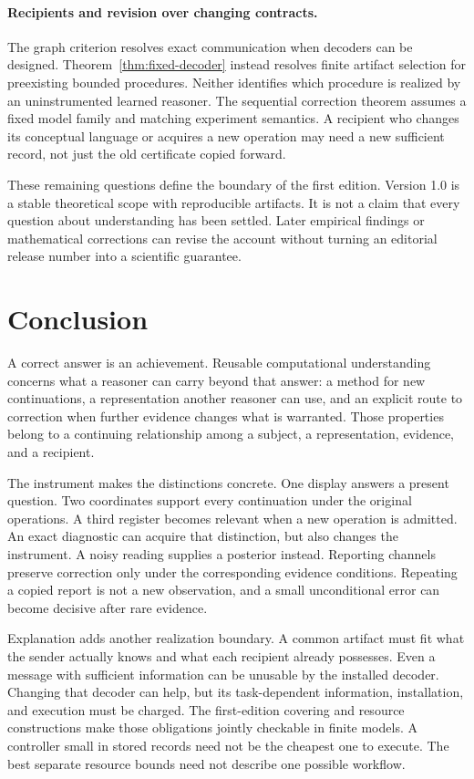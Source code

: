 \documentclass[11pt,letterpaper]{article}
\theoremstyle{plain}
\theoremstyle{definition}
\begin{document}
\paragraph{Recipients and revision over changing contracts.}
The graph criterion resolves exact communication when decoders can be designed. Theorem~\ref{thm:fixed-decoder} instead resolves finite artifact selection for preexisting bounded procedures. Neither identifies which procedure is realized by an uninstrumented learned reasoner. The sequential correction theorem assumes a fixed model family and matching experiment semantics. A recipient who changes its conceptual language or acquires a new operation may need a new sufficient record, not just the old certificate copied forward.

These remaining questions define the boundary of the first edition. Version 1.0 is a stable theoretical scope with reproducible artifacts. It is not a claim that every question about understanding has been settled. Later empirical findings or mathematical corrections can revise the account without turning an editorial release number into a scientific guarantee.

\section{Conclusion}\label{sec:conclusion}
A correct answer is an achievement. Reusable computational understanding concerns what a reasoner can carry beyond that answer: a method for new continuations, a representation another reasoner can use, and an explicit route to correction when further evidence changes what is warranted. Those properties belong to a continuing relationship among a subject, a representation, evidence, and a recipient.

The instrument makes the distinctions concrete. One display answers a present question. Two coordinates support every continuation under the original operations. A third register becomes relevant when a new operation is admitted. An exact diagnostic can acquire that distinction, but also changes the instrument. A noisy reading supplies a posterior instead. Reporting channels preserve correction only under the corresponding evidence conditions. Repeating a copied report is not a new observation, and a small unconditional error can become decisive after rare evidence.

Explanation adds another realization boundary. A common artifact must fit what the sender actually knows and what each recipient already possesses. Even a message with sufficient information can be unusable by the installed decoder. Changing that decoder can help, but its task-dependent information, installation, and execution must be charged. The first-edition covering and resource constructions make those obligations jointly checkable in finite models. A controller small in stored records need not be the cheapest one to execute. The best separate resource bounds need not describe one possible workflow.
\end{document}
